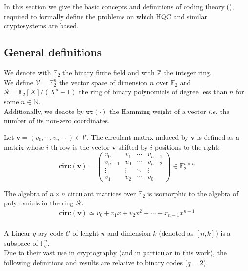 In this section we give the basic concepts and definitions of coding theory (\cite{macwilliams1977theory}), required to formally define
the problems on which HQC and similar cryptosystems are based.

\subsection{General definitions}
We denote with $\mathds{F}_2$ the binary finite field and with $\mathds{Z}$ the integer ring.\\
We define $\mathcal{V} = \mathds{F}_2^n$ the vector space of dimension $n$ over $\mathds{F}_2$ 
and $\mathcal{R}=\mathds{F}_2[X]/(X^n-1)$ the ring of binary polynomials of degree less than $n$ for some $n \in \mathds{N}$.\\
Additionally, we denote by $\texttt{wt}(\cdot)$ the Hamming weight of a vector \textit{i.e.} the number of its non-zero coordinates.

\begin{definition}
    Let $\mathbf{v} = (v_0, \cdots, v_{n-1}) \in \mathcal{V}$. The circulant matrix induced by $\mathbf{v}$ is defined as
    a matrix whose $i$-th row is the vector $\mathbf{v}$ shifted by $i$ positions to the right:
    \begin{equation*}
        \mathbf{circ(v)} = \begin{pmatrix}
            v_0 & v_1 & \cdots & v_{n-1} \\
            v_{n-1} & v_0 & \cdots & v_{n-2} \\
            \vdots & \vdots & \ddots & \vdots \\
            v_1 & v_2 & \cdots & v_0
            \end{pmatrix} \in \mathds{F}_2^{n\times n}
    \end{equation*}
\end{definition}
The algebra of $n\times n$ circulant matrices over $\mathds{F}_2$ is isomorphic to the algebra of polynomials
in the ring $\mathcal{R}$:
\begin{align*}
    \mathbf{circ(v)} \simeq v_0 + v_1x + v_2x^2 + \cdots + x_{n-1}x^{n-1} \\
\end{align*}

\begin{definition}
    A Linear $q$-ary code $\mathcal{C}$ of lenght $n$ and dimension $k$ (denoted as $[n, k]$) is a subspace of $\mathds{F}_q^n$.\\
    Due to their vast use in cryptography (and in particular in this work), the following definitions and results are relative
    to binary codes ($q=2$).
\end{definition}

